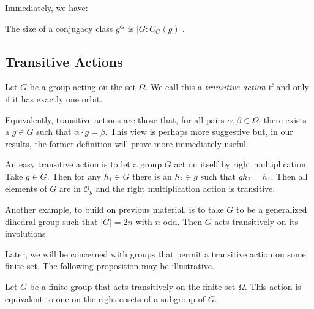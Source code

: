 \documentclass[main.tex]{subfiles}
\begin{document}
Immediately, we have:

\begin{corollary}
The size of a conjugacy class $g^G$ is $|G : C_G(g)|$.
\end{corollary}

\hss

\subsection{Transitive Actions}

\hss

\begin{definition}
Let $G$ be a group acting on the set $\Omega$. We call this a \emph{transitive action} if and only if it has exactly one orbit.
\end{definition}

\hss

Equivalently, transitive actions are those that, for all pairs $\alpha, \beta \in \Omega$, there exists a $g \in G$ such that $ \alpha \cdot g = \beta$. This view is perhaps more suggestive but, in our results, the former definition will prove more immediately useful.

An easy transitive action is to let a group $G$ act on itself by right multiplication. Take $g \in G$. Then for any $h_1 \in G$ there is an $h_2 \in g$ such that $g h_2 = h_1$. Then all elements of $G$ are in $\mathcal{O}_g$ and the right multiplication action is transitive.

Another example, to build on previous material, is to take $G$ to be a generalized dihedral group such that $|G| = 2n$ with $n$ odd. Then $G$ acts transitively on its involutions.

\hss

Later, we will be concerned with groups that permit a transitive action on some finite set. The following proposition may be illustrative.

\begin{theorem}\label{transitivegroup}
Let $G$ be a finite group that acts transitively on the finite set $\Omega$. This action is equivalent to one on the right cosets of a subgroup of $G$.
\end{theorem}
\end{document}

